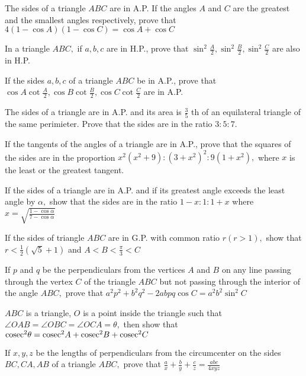 \item The sides of a triangle $ABC$ are in A.P. If the angles $A$ and $C$ are the greatest and the smallest angles
     respectively, prove that $4(1 - \cos A)(1 - \cos C) = \cos A + \cos C$

\item In a triangle $ABC,$ if $a, b, c$ are in H.P., prove that $\sin^2\frac{A}{2}, \sin^2\frac{B}{2},
     \sin^2\frac{C}{2}$ are also in H.P.

\item If the sides $a, b, c$ of a triangle $ABC$ be in A.P., prove that $\cos A\cot\frac{A}{2}, \cos
     B\cot\frac{B}{2}, \cos C\cot\frac{C}{2}$ are in A.P.

\item The sides of a triangle are in A.P. and its area is $\frac{3}{5}$ th of an equilateral triangle of the same
     perimieter. Prove that the sides are in the ratio $3:5:7.$

\item If the tangents of the angles of a triangle are in A.P., prove that the squares of the sides are in the proportion
     $x^2(x^2 + 9): (3 + x^2)^2:9(1 + x^2),$ where $x$ is the least or the greatest tangent.

\item If the sides of a triangle are in A.P. and if its greatest angle exceeds the least angle by $\alpha,$ show that the
     sides are in the ratio $1 - x:1:1 + x$ where $x = \sqrt{\frac{1 - \cos\alpha}{7 - \cos\alpha}}$

\item If the sides of triangle $ABC$ are in G.P. with common ratio $r(r>1),$ show that $r<\frac{1}{2}(\sqrt{5} +
     1)$ and $A<B<\frac{\pi}{3}<C$

\item If $p$ and $q$ be the perpendiculars from the vertices $A$ and $B$ on any line passing through the
     vertex $C$ of the triangle $ABC$ but not passing through the interior of the angle $ABC,$ prove that
     $a^2p^2 + b^2q^2 - 2abpq\cos C = a^2b^2\sin^2C$

\item $ABC$ is a triangle, $O$ is a point inside the triangle such that $\angle OAB = \angle OBC = \angle OCA =
     \theta,$ then show that ${\rm cosec}^2\theta = {\rm cosec}^2A + {\rm cosec}^2B + {\rm cosec}^2C$

\item If $x, y, z$ be the lengths of perpendiculars from the circumcenter on the sides $BC, CA, AB$ of a triangle
     $ABC,$ prove that $\frac{a}{x} + \frac{b}{y} + \frac{c}{z} = \frac{abc}{4xyz}$

